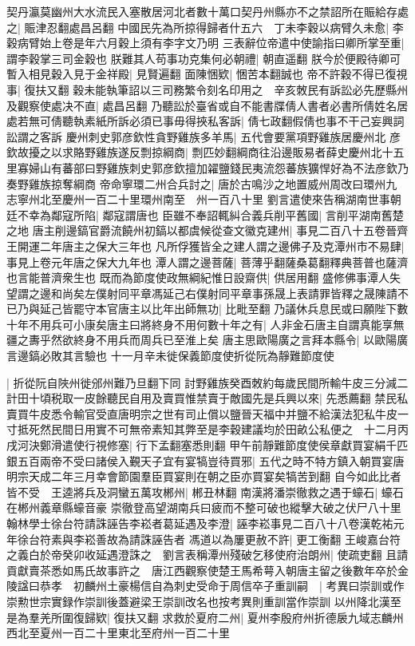 契丹瀛莫幽州大水流民入塞散居河北者數十萬口契丹州縣亦不之禁詔所在賑給存處之|{
	賑津忍翻處昌呂翻}
中國民先為所掠得歸者什五六　丁未李穀以病臂久未愈|{
	李穀病臂始上卷是年六月穀上須有李字文乃明}
三表辭位帝遣中使諭指曰卿所掌至重|{
	謂李穀掌三司金穀也}
朕難其人苟事功克集何必朝禮|{
	朝直遥翻}
朕今於便殿待卿可暫入相見穀入見于金祥殿|{
	見賢遍翻}
面陳悃欵|{
	悃苦本翻誠也}
帝不許穀不得已復視事|{
	復扶又翻}
穀未能執筆詔以三司務繁令刻名印用之　辛亥敇民有訴訟必先歷縣州及觀察使處决不直|{
	處昌呂翻}
乃聽訟於臺省或自不能書牒倩人書者必書所倩姓名居處若無可倩聽執素紙所訴必須已事毋得挾私客訴|{
	倩七政翻假倩也事不干己妄興詞訟謂之客訴}
慶州刺史郭彦欽性貪野雞族多羊馬|{
	五代會要黨項野雞族居慶州北}
彦欽故擾之以求賂野雞族遂反剽掠綱商|{
	剽匹妙翻綱商往沿邊販易者薛史慶州北十五里寡婦山有蕃部曰野雞族刺史郭彦欽擅加糴鹽錢民夷流怨蕃族獷悍好為不法彦欽乃奏野雞族掠奪綱商}
帝命寧環二州合兵討之|{
	唐於古鳴沙之地置威州周改曰環州九　志寧州北至慶州一百二十里環州南至　州一百八十里}
劉言遣使來告稱湖南世事朝廷不幸為鄰寇所陷|{
	鄰寇謂唐也}
臣雖不奉詔輒糾合義兵削平舊國|{
	言削平湖南舊楚之地}
唐主削邊鎬官爵流饒州初鎬以都虞候從查文徽克建州|{
	事見二百八十五卷晉齊王開運二年唐主之保大三年也}
凡所俘獲皆全之建人謂之邊佛子及克潭州市不易肆|{
	事見上卷元年唐之保大九年也}
潭人謂之邊菩薩|{
	菩薄乎翻薩桑葛翻釋典菩普也薩濟也言能普濟衆生也}
既而為節度使政無綱紀惟日設齋供|{
	供居用翻}
盛修佛事潭人失望謂之邊和尚矣左僕射同平章馮延己右僕射同平章事孫晟上表請罪皆釋之晟陳請不已乃與延己皆罷守本官唐主以比年出師無功|{
	比毗至翻}
乃議休兵息民或曰願陛下數十年不用兵可小康矣唐主曰將終身不用何數十年之有|{
	人非金石唐主自謂真能享無疆之夀乎然欲終身不用兵而周兵已至淮上矣}
唐主思歐陽廣之言拜本縣令|{
	以歐陽廣言邊鎬必敗其言驗也}
十一月辛未徙保義節度使折從阮為靜難節度使

|{
	折從阮自陜州徙邠州難乃旦翻下同}
討野雞族癸酉敇約每歲民間所輸牛皮三分減二計田十頃税取一皮餘聽民自用及賣買惟禁賣于敵國先是兵興以來|{
	先悉薦翻}
禁民私賣買牛皮悉令輸官受直唐明宗之世有司止償以鹽晉天福中并鹽不給漢法犯私牛皮一寸抵死然民間日用實不可無帝素知其弊至是李穀建議均於田畝公私便之　十二月丙戌河決鄭滑遣使行視修塞|{
	行下孟翻塞悉則翻}
甲午前靜難節度使侯章獻買宴絹千匹銀五百兩帝不受曰諸侯入覲天子宜有宴犒豈待買邪|{
	五代之時不特方鎮入朝買宴唐明宗天成二年三月幸會節園羣臣買宴則在朝之臣亦買宴矣犒苦到翻}
自今如此比者皆不受　王逵將兵及洞蠻五萬攻郴州|{
	郴丑林翻}
南漢將潘崇徹救之遇于蠔石|{
	蠔石在郴州義章縣蠔音豪}
崇徹登高望湖南兵曰疲而不整可破也縱擊大破之伏尸八十里　翰林學士徐台符請誅誣告李崧者葛延遇及李澄|{
	誣李崧事見二百八十八卷漢乾祐元年徐台符素與李崧善故為請誅誣告者}
馮道以為屢更赦不許|{
	更工衡翻}
王峻嘉台符之義白於帝癸卯收延遇澄誅之　劉言表稱潭州殘破乞移使府治朗州|{
	使疏吏翻}
且請貢獻賣茶悉如馬氏故事許之　唐江西觀察使楚王馬希萼入朝唐主留之後數年卒於金陵諡曰恭孝　初麟州土豪楊信自為刺史受命于周信卒子重訓嗣　|{
	考異曰崇訓或作崇勲世宗實録作崇訓後蓋避梁王崇訓改名也按考異則重訓當作崇訓}
以州降北漢至是為羣羌所圍復歸欵|{
	復扶又翻}
求救於夏府二州|{
	夏州李殷府州折德扆九域志麟州西北至夏州一百二十里東北至府州一百二十里}


